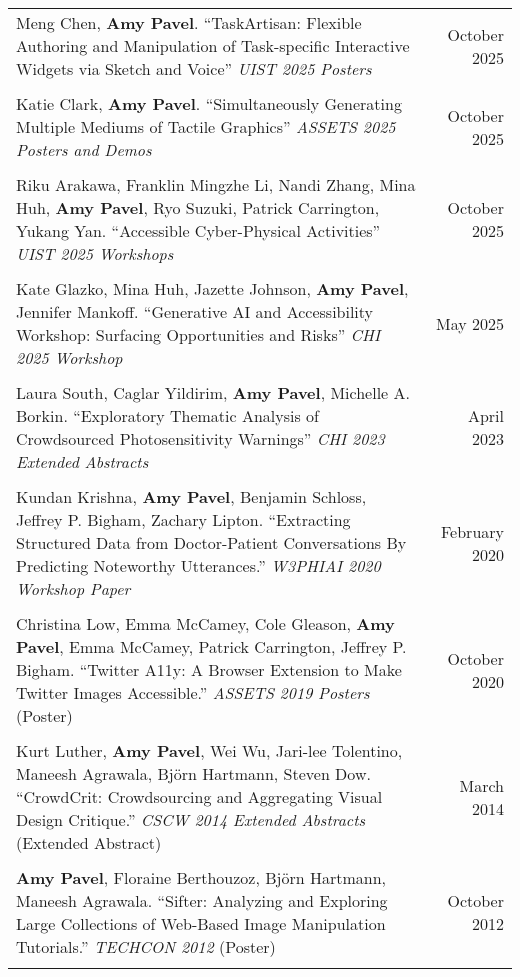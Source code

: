 \begin{longtable}{Xr}
	Meng Chen, \textbf{Amy Pavel}. ``TaskArtisan: Flexible Authoring and Manipulation of Task-specific Interactive Widgets via Sketch and Voice'' \textit{UIST 2025 Posters} & October 2025 \\
	\\

	Katie Clark, \textbf{Amy Pavel}. ``Simultaneously Generating Multiple Mediums of Tactile Graphics'' \textit{ASSETS 2025 Posters and Demos} & October 2025 \\
	\\

	Riku Arakawa, Franklin Mingzhe Li, Nandi Zhang, Mina Huh, \textbf{Amy Pavel}, Ryo Suzuki, Patrick Carrington, Yukang Yan. ``Accessible Cyber-Physical Activities'' \textit{UIST 2025 Workshops} & October 2025 \\
	\\

	Kate Glazko, Mina Huh, Jazette Johnson, \textbf{Amy Pavel}, Jennifer Mankoff. ``Generative AI and Accessibility Workshop: Surfacing Opportunities and Risks'' \textit{CHI 2025 Workshop} & May 2025 \\
	\\

	Laura South, Caglar Yildirim, \textbf{Amy Pavel}, Michelle A. Borkin. ``Exploratory Thematic Analysis of Crowdsourced Photosensitivity Warnings'' \textit{CHI 2023 Extended Abstracts} & April 2023 \\
	\\

	Kundan Krishna, \textbf{Amy Pavel}, Benjamin Schloss, Jeffrey P. Bigham, Zachary Lipton. ``Extracting Structured Data from Doctor-Patient Conversations By Predicting Noteworthy Utterances.'' \textit{W3PHIAI 2020 Workshop Paper} & February 2020 \\
	\\

	Christina Low, Emma McCamey, Cole Gleason, \textbf{Amy Pavel}, Emma McCamey, Patrick Carrington, Jeffrey P. Bigham. ``Twitter A11y: A Browser Extension to Make Twitter Images Accessible.'' \textit{ASSETS 2019 Posters} (Poster) & October 2020 \\
	\\

	Kurt Luther, \textbf{Amy Pavel}, Wei Wu, Jari-lee Tolentino, Maneesh Agrawala, Björn Hartmann, Steven Dow. ``CrowdCrit: Crowdsourcing and Aggregating Visual Design Critique.'' \textit{CSCW 2014 Extended Abstracts} (Extended Abstract) & March 2014 \\
	\\

	\textbf{Amy Pavel}, Floraine Berthouzoz, Björn Hartmann, Maneesh Agrawala. ``Sifter: Analyzing and Exploring Large Collections of Web-Based Image Manipulation Tutorials.'' \textit{TECHCON 2012} (Poster) & October 2012 \\
	\\

\end{longtable}